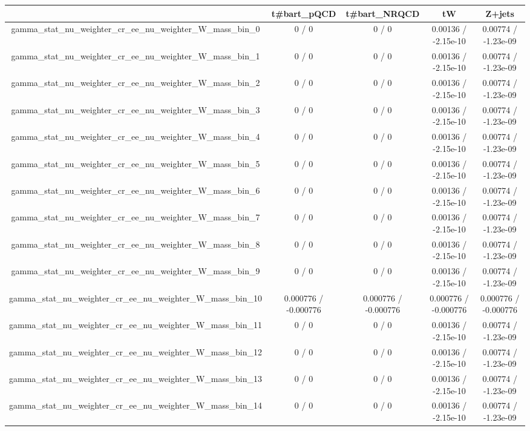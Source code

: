 \documentclass[10pt]{article}
\begin{document}
\begin{table}[htbp]
\begin{center}
\begin{tabular}{|c|c|c|c|c|}
\hline 
      & t#bar{t}_{pQCD}      & t#bar{t}_{NRQCD}      & tW      & Z+jets \\ 
\hline 
  gamma_stat_nu_weighter_cr_ee_nu_weighter_W_mass_bin_0 & 0 / 0 & 0 / 0 & 0.00136 / -2.15e-10 & 0.00774 / -1.23e-09 \\ 
  gamma_stat_nu_weighter_cr_ee_nu_weighter_W_mass_bin_1 & 0 / 0 & 0 / 0 & 0.00136 / -2.15e-10 & 0.00774 / -1.23e-09 \\ 
  gamma_stat_nu_weighter_cr_ee_nu_weighter_W_mass_bin_2 & 0 / 0 & 0 / 0 & 0.00136 / -2.15e-10 & 0.00774 / -1.23e-09 \\ 
  gamma_stat_nu_weighter_cr_ee_nu_weighter_W_mass_bin_3 & 0 / 0 & 0 / 0 & 0.00136 / -2.15e-10 & 0.00774 / -1.23e-09 \\ 
  gamma_stat_nu_weighter_cr_ee_nu_weighter_W_mass_bin_4 & 0 / 0 & 0 / 0 & 0.00136 / -2.15e-10 & 0.00774 / -1.23e-09 \\ 
  gamma_stat_nu_weighter_cr_ee_nu_weighter_W_mass_bin_5 & 0 / 0 & 0 / 0 & 0.00136 / -2.15e-10 & 0.00774 / -1.23e-09 \\ 
  gamma_stat_nu_weighter_cr_ee_nu_weighter_W_mass_bin_6 & 0 / 0 & 0 / 0 & 0.00136 / -2.15e-10 & 0.00774 / -1.23e-09 \\ 
  gamma_stat_nu_weighter_cr_ee_nu_weighter_W_mass_bin_7 & 0 / 0 & 0 / 0 & 0.00136 / -2.15e-10 & 0.00774 / -1.23e-09 \\ 
  gamma_stat_nu_weighter_cr_ee_nu_weighter_W_mass_bin_8 & 0 / 0 & 0 / 0 & 0.00136 / -2.15e-10 & 0.00774 / -1.23e-09 \\ 
  gamma_stat_nu_weighter_cr_ee_nu_weighter_W_mass_bin_9 & 0 / 0 & 0 / 0 & 0.00136 / -2.15e-10 & 0.00774 / -1.23e-09 \\ 
  gamma_stat_nu_weighter_cr_ee_nu_weighter_W_mass_bin_10 & 0.000776 / -0.000776 & 0.000776 / -0.000776 & 0.000776 / -0.000776 & 0.000776 / -0.000776 \\ 
  gamma_stat_nu_weighter_cr_ee_nu_weighter_W_mass_bin_11 & 0 / 0 & 0 / 0 & 0.00136 / -2.15e-10 & 0.00774 / -1.23e-09 \\ 
  gamma_stat_nu_weighter_cr_ee_nu_weighter_W_mass_bin_12 & 0 / 0 & 0 / 0 & 0.00136 / -2.15e-10 & 0.00774 / -1.23e-09 \\ 
  gamma_stat_nu_weighter_cr_ee_nu_weighter_W_mass_bin_13 & 0 / 0 & 0 / 0 & 0.00136 / -2.15e-10 & 0.00774 / -1.23e-09 \\ 
  gamma_stat_nu_weighter_cr_ee_nu_weighter_W_mass_bin_14 & 0 / 0 & 0 / 0 & 0.00136 / -2.15e-10 & 0.00774 / -1.23e-09 \\ 

\end{tabular}
\end{center}
\end{table}
\end{document}
